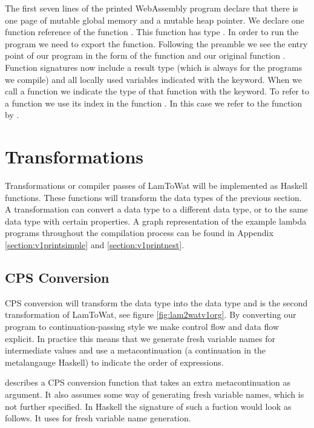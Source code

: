 {The first seven lines of the printed WebAssembly program declare that there is one page of mutable global memory and a mutable heap pointer. We declare one function reference of the function . This function has type . In order to run the program we need to export the  function. Following the preamble we see the entry point of our program in the form of the function  and our original function . Function signatures now include a result type (which is always  for the programs we compile) and all locally used variables indicated with the  keyword. When we call a function we indicate the type of that function with the  keyword. To refer to a function we use its index in the function . In this case we refer to the function  by .

\section{\label{section:transforms}Transformations}
Transformations or compiler passes of LamToWat will be implemented as Haskell functions. These functions will transform the data types of the previous section. A transformation can convert a data type to a different data type, or to the same data type with certain properties. A graph representation of the example lambda programs throughout the compilation process can be found in Appendix \ref{section:v1printsimple} and \ref{section:v1printnest}.

\subsection{\label{subsection:cpsconvert}CPS Conversion}
CPS conversion will transform the  data type into the  data type and is the second transformation of LamToWat, see figure \ref{fig:lam2watv1org}. By converting our program to continuation-passing style we make control flow and data flow explicit. In practice this means that we generate fresh variable names for intermediate values and use a metacontinuation (a continuation in the metalangauge Haskell) to indicate the order of expressions.

\citeauthor{DBLP:books/daglib/0022396} describes a CPS conversion function that takes an extra metacontinuation as argument. It also assumes some way of generating fresh variable names, which is not further specified. In Haskell the signature of such a fuction would look as follows. It uses  for fresh variable name generation.

}
